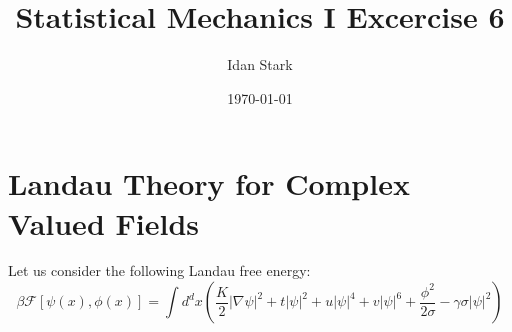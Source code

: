 \documentclass{article}
\title{Statistical Mechanics I Excercise 6}
\author{Idan Stark}
\date{\today}
\begin{document}
\maketitle

\section{Landau Theory for Complex Valued Fields}
Let us consider the following Landau free energy:
\begin{equation}
    \beta\mathcal{F}\left[\psi(x),\phi(x)\right] = \int d^dx\left(
        \frac{K}{2}\left|\nabla\psi\right|^2 + t\left|\psi\right|^2 + u\left|\psi\right|^4 + v\left|\psi\right|^6 + \frac{\phi^2}{2\sigma} - \gamma\sigma\left|\psi\right|^2
    \right)
\end{equation}
\end{document}
